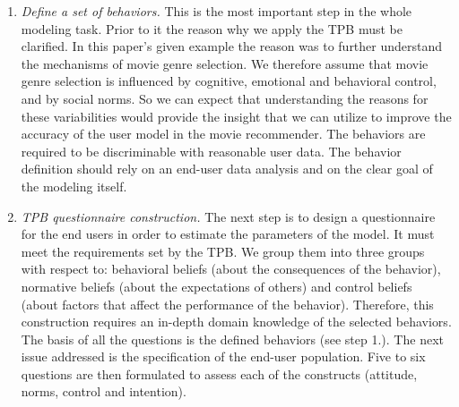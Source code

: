 \documentclass{llncs}
\begin{document}
\begin{enumerate}
 \item {\it Define a set of behaviors.} This is the most important step in the whole modeling task. Prior to it the reason why we apply the TPB must be clarified. In this paper’s given example the reason was to further understand the mechanisms of movie genre selection. We therefore assume that movie genre selection is influenced by cognitive, emotional and behavioral control, and by social norms.%
So we can expect that understanding the reasons for these variabilities would provide the insight that we can utilize to improve the accuracy of the user model in the movie recommender. 
The behaviors are required to be discriminable with reasonable user data. 
The behavior definition should rely on an end-user data analysis and on the clear goal of the modeling itself.   
 \item {\it TPB questionnaire construction.} The next step is to design a questionnaire for the end users in order to estimate the parameters of the model. It must meet the requirements set by the TPB. We group them into three groups with respect to: behavioral beliefs (about the consequences of the behavior), normative beliefs (about the expectations of others) and control beliefs (about factors that affect the performance of the behavior). Therefore, this construction requires an in-depth domain knowledge of the selected behaviors. The basis of all the questions is the defined behaviors (see step 1.). The next issue addressed is the specification of the end-user population. Five to six questions are then formulated to assess each of the constructs (attitude, norms, control and intention). 

\end{enumerate}
\end{document}
